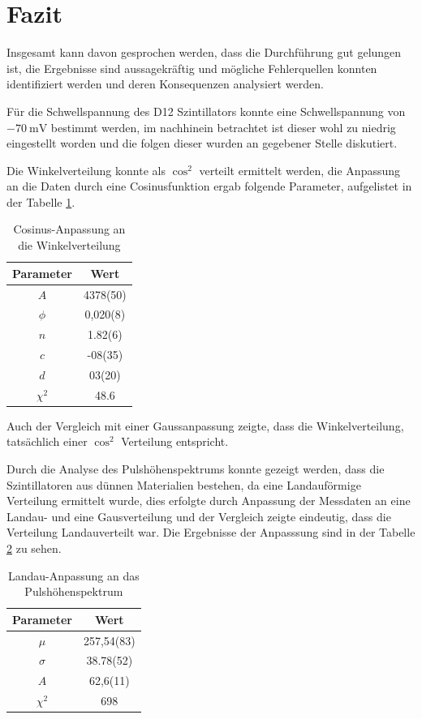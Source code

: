 \documentclass{article}
\begin{document}
\section{Fazit}
Insgesamt kann davon gesprochen werden, dass die Durchführung gut gelungen ist, die Ergebnisse sind aussagekräftig und mögliche Fehlerquellen konnten identifiziert werden und deren Konsequenzen analysiert werden.

Für die Schwellspannung des D12 Szintillators konnte eine Schwellspannung von $\SI{-70}{\milli\volt}$ bestimmt werden, im nachhinein betrachtet ist dieser wohl zu niedrig eingestellt worden und die folgen dieser wurden
an gegebener Stelle diskutiert.

Die Winkelverteilung konnte als $\cos^2$ verteilt ermittelt werden, die Anpassung an die Daten durch eine Cosinusfunktion ergab folgende Parameter, aufgelistet in der Tabelle \ref{tab:CosinusAnpassungWinkelverteilungFazit}.
\begin{table}[H]
    \centering
    \caption{Cosinus-Anpassung an die Winkelverteilung}
    \begin{tabular}{|c|c|}
        \hline
        Parameter & Wert \\ \hline \hline
        $A$ & 4378(50) \\ \hline
        $\phi$ & 0,020(8) \\ \hline
        $n$ & 1.82(6) \\ \hline
        $c$ & -08(35) \\ \hline
        $d$ & 03(20) \\ \hline
        $\chi^2$ & 48.6 \\ \hline
    \end{tabular}
    \label{tab:CosinusAnpassungWinkelverteilungFazit}
\end{table}
Auch der Vergleich mit einer Gaussanpassung zeigte, dass die Winkelverteilung, tatsächlich einer $\cos^2$ Verteilung entspricht.

Durch die Analyse des Pulshöhenspektrums konnte gezeigt werden, dass die Szintillatoren aus dünnen Materialien bestehen, da eine Landauförmige Verteilung ermittelt wurde, dies erfolgte durch Anpassung der Messdaten an eine
Landau- und eine Gausverteilung und der Vergleich zeigte eindeutig, dass die Verteilung Landauverteilt war. Die Ergebnisse der Anpasssung sind in der Tabelle \ref{tab:LandauAnpassungPulshoheFazit} zu sehen.
\begin{table}[H]
    \centering
    \caption{Landau-Anpassung an das Pulshöhenspektrum}
    \begin{tabular}{|c|c|}
        \hline
        Parameter & Wert \\ \hline \hline
        $\mu$ & 257,54(83) \\ \hline
        $\sigma$ & 38.78(52) \\ \hline
        $A$ & 62,6(11) \\ \hline
        $\chi^2$ & 698 \\ \hline
    \end{tabular}
    \label{tab:LandauAnpassungPulshoheFazit}
\end{table}
\end{document}
